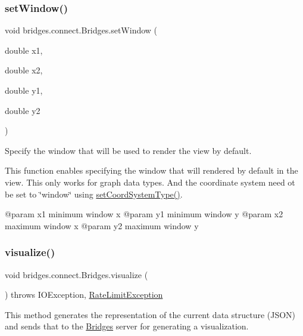 \subsubsection{\texorpdfstring{setWindow()}{setWindow()}\hspace{0.1cm}{\footnotesize\ttfamily [3/3]}}
{\footnotesize\ttfamily void bridges.\+connect.\+Bridges.\+set\+Window (\begin{DoxyParamCaption}\item[{double}]{x1,  }\item[{double}]{x2,  }\item[{double}]{y1,  }\item[{double}]{y2 }\end{DoxyParamCaption})}



Specify the window that will be used to render the view by default. 

This function enables specifying the window that will rendered by default in the view. This only works for graph data types. And the coordinate system need ot be set to \char`\"{}window\char`\"{} using \mbox{\hyperlink{classbridges_1_1connect_1_1_bridges_ade4a9c43e2b608e6b3dc774b73f95749}{set\+Coord\+System\+Type()}}. \begin{DoxyVerb}@param x1   minimum window x
@param y1   minimum window y
@param x2   maximum window x
@param y2   maximum window y
\end{DoxyVerb}
 \mbox{\label{classbridges_1_1connect_1_1_bridges_a1853d64ffb8675ba2ec227a2b819cd24}} 
\subsubsection{\texorpdfstring{visualize()}{visualize()}}
{\footnotesize\ttfamily void bridges.\+connect.\+Bridges.\+visualize (\begin{DoxyParamCaption}{ }\end{DoxyParamCaption}) throws I\+O\+Exception, \mbox{\hyperlink{classbridges_1_1validation_1_1_rate_limit_exception}{Rate\+Limit\+Exception}}}

This method generates the representation of the current data structure (J\+S\+ON) and sends that to the \mbox{\hyperlink{classbridges_1_1connect_1_1_bridges}{Bridges}} server for generating a visualization.


